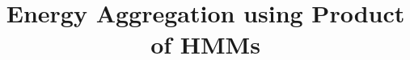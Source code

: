 \documentclass[conference]{IEEEtran}
\begin{document}
%
\title{Energy Aggregation using Product of HMMs}




% 
\end{document}

